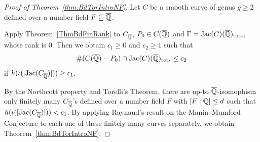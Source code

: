 
\begin{proof}[Proof of Theorem~\ref{thm:BdTorIntroNF}]
Let $C$ be a smooth curve of genus $g\ge 2$  defined over a number field $F\subseteq{\overline{\mathbb{Q}}}$.
  
Apply Theorem~\ref{ThmBdFinRank} to $C_{{\overline{\mathbb{Q}}}}$, $P_0 \in C({\overline{\mathbb{Q}}})$
and $\Gamma = \mathrm{Jac}(C)({{\overline{\mathbb{Q}}}})_{\mathrm{tors}}$, whose rank is $0$. Then we obtain $c_1 \ge 0$ and $c_2 \ge 1$ such that
  \[
  \#(C({\overline{\mathbb{Q}}}) - P_0) \cap \mathrm{Jac}(C)({{\overline{\mathbb{Q}}}})_{\mathrm{tors}} \le c_2
  \]
  if $h(\iota([\mathrm{Jac}(C_{\overline{\mathbb{Q}}})])) \ge c_1$.
  
By the Northcott property and Torelli's Theorem, there are up-to
${\overline{\mathbb{Q}}}$-isomophism only finitely many $C_{{\overline{\mathbb{Q}}}}$'s  defined over a number field $F$ with $[F:{\mathbb{Q}}] \le d$ such that  $h(\iota([\mathrm{Jac}(C_{\overline{\mathbb{Q}}})])) < c_1$. By applying Raynaud's result on the Manin--Mumford Conjecture to each one of these finitely many curves separately, we obtain Theorem~\ref{thm:BdTorIntroNF}.
\end{proof}

